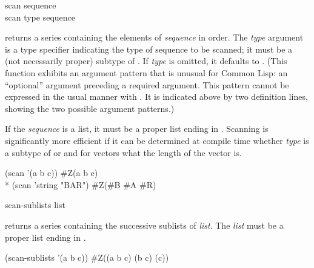\begin{defun}[Function]
scan sequence \\
scan type sequence

 returns a series containing the elements of {\it sequence} in
order.  The {\it type} argument is a type specifier indicating the type of
sequence to be scanned; it must be a (not necessarily proper) subtype of
.  If {\it type} is omitted, it defaults to .
(This function exhibits an argument pattern that is unusual for Common
Lisp:  an ``optional'' argument preceding a required argument.  This
pattern cannot be expressed in the usual manner with .  It
is indicated above by two definition lines, showing the two possible
argument patterns.)

If the {\it sequence} is a list, it must be a proper list ending in .
Scanning is significantly more efficient if it can be determined at compile
time whether {\it type} is a subtype of  or  and for
vectors what the length of the vector is.
\begin{lisp}
(scan '(a b c)) {\EV} \#Z(a b c) \\*
(scan 'string "BAR") {\EV} \#Z(\#{\Xbackslash}B \#{\Xbackslash}A \#{\Xbackslash}R)
\end{lisp}
\end{defun}

\begin{defun}[Function]
scan-sublists list

 returns a series containing the successive sublists of
{\it list}.  The {\it list} must be a proper list ending in .
\begin{lisp}
(scan-sublists '(a b c)) {\EV} \#Z((a b c) (b c) (c))
\end{lisp}
\end{defun}

